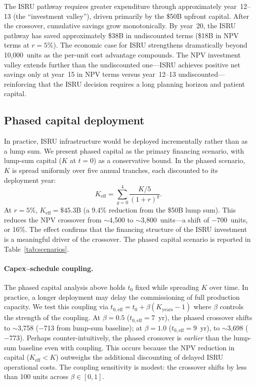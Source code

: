 \documentclass[preprint,12pt]{elsarticle}
\begin{document}
The ISRU pathway requires greater expenditure through approximately year~12--13 (the ``investment valley''), driven primarily by the \$50B upfront capital. After the crossover, cumulative savings grow monotonically. By year~20, the ISRU pathway has saved approximately \$38B in undiscounted terms (\$18B in NPV terms at $r = 5\%$). The economic case for ISRU strengthens dramatically beyond 10{,}000~units as the per-unit cost advantage compounds. The NPV investment valley extends further than the undiscounted one---ISRU achieves positive net savings only at year~15 in NPV terms versus year~12--13 undiscounted---reinforcing that the ISRU decision requires a long planning horizon and patient capital.

\subsection{Phased capital deployment}
\label{sec:phased_capital}

In practice, ISRU infrastructure would be deployed incrementally rather than as a lump sum. We present phased capital as the primary financing scenario, with lump-sum capital ($K$ at $t = 0$) as a conservative bound. In the phased scenario, $K$ is spread uniformly over five annual tranches, each discounted to its deployment year:
\begin{equation}
  K_{\mathrm{eff}} = \sum_{y=0}^{4} \frac{K/5}{(1+r)^y}.
  \label{eq:phased_capital}
\end{equation}
At $r = 5\%$, $K_{\mathrm{eff}} = \$45.3$B (a 9.4\% reduction from the \$50B lump sum). This reduces the NPV crossover from $\sim$4{,}500 to $\sim$3{,}800~units---a shift of $-$700~units, or 16\%. The effect confirms that the financing structure of the ISRU investment is a meaningful driver of the crossover. The phased capital scenario is reported in Table~\ref{tab:scenarios}.

\paragraph{Capex--schedule coupling.} The phased capital analysis above holds $t_0$ fixed while spreading $K$ over time. In practice, a longer deployment may delay the commissioning of full production capacity. We test this coupling via $t_{0,\mathrm{eff}} = t_0 + \beta(K_{\mathrm{years}} - 1)$ where $\beta$ controls the strength of the coupling. At $\beta = 0.5$ ($t_{0,\mathrm{eff}} = 7$~yr), the phased crossover shifts to $\sim$3{,}758 ($-$713 from lump-sum baseline); at $\beta = 1.0$ ($t_{0,\mathrm{eff}} = 9$~yr), to $\sim$3{,}698 ($-$773). Perhaps counter-intuitively, the phased crossover is \emph{earlier} than the lump-sum baseline even with coupling. This occurs because the NPV reduction in capital ($K_{\mathrm{eff}} < K$) outweighs the additional discounting of delayed ISRU operational costs. The coupling sensitivity is modest: the crossover shifts by less than 100 units across $\beta \in [0, 1]$.
\end{document}
